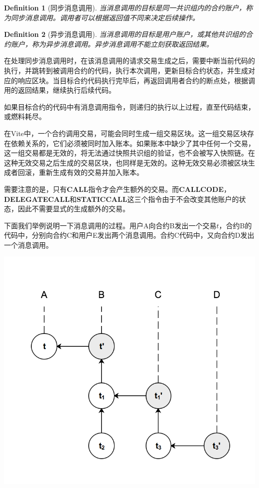 \documentclass[UTF8,nofonts]{ctexart}
\newtheorem{definition}{Definition}[section]
\begin{document}
\begin{multicols}{2}
\begin{definition}[同步消息调用]
当消息调用的目标是同一共识组内的合约账户，称为同步消息调用。调用者可以根据返回值不同来决定后续操作。
\end{definition}

\begin{definition}[异步消息调用]
当消息调用的目标是用户账户，或其他共识组的合约账户，称为异步消息调用。异步消息调用不能立刻获取返回结果。
\end{definition}

在处理同步消息调用时，在该消息调用的请求交易生成之后，需要中断当前代码的执行，并跳转到被调用合约的代码，执行本次调用，更新目标合约状态，并生成对应的响应区块。当目标合约代码执行完毕后，再返回调用者合约的断点处，根据调用的返回结果，继续执行后续代码。

如果目标合约的代码中有消息调用指令，则递归的执行以上过程，直至代码结束，或燃料耗尽。

在Vite中，一个合约调用交易，可能会同时生成一组交易区块。这一组交易区块存在依赖关系的，它们必须被同时加入账本。如果账本中缺少了其中任何一个交易，这一组交易都是无效的，将无法通过快照共识组的验证，也不会被写入快照链。在这种无效交易之后生成的交易区块，也同样是无效的。这种无效交易必须被区块生成者回滚，重新生成有效的交易并加入账本。

需要注意的是，只有\textbf{CALL}指令才会产生额外的交易。而\textbf{CALLCODE}，\textbf{DELEGATECALL}和\textbf{STATICCALL}这三个指令由于不会改变其他账户的状态，因此不需要显式的生成额外的交易。

下面我们举例说明一下消息调用的过程。用户A向合约B发出一个交易$t$，合约B的代码中，分别向合约C和用户E发出两个消息调用。合约C代码中，又向合约D发出一个消息调用。

\includegraphics[width=.8\linewidth]{image/messagecall.png}


\end{multicols}
\end{document}
